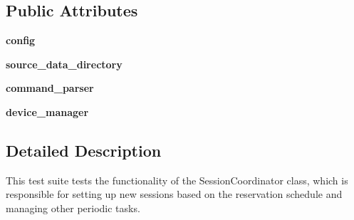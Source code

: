 \subsection*{Public Attributes}
\begin{DoxyCompactItemize}
\item 
\hypertarget{classhwm_1_1sessions_1_1tests_1_1test__coordinator_1_1_test_coordinator_a3f7b40a4155ad7addb3dff58a7bf736a}{{\bfseries config}}\label{classhwm_1_1sessions_1_1tests_1_1test__coordinator_1_1_test_coordinator_a3f7b40a4155ad7addb3dff58a7bf736a}

\item 
\hypertarget{classhwm_1_1sessions_1_1tests_1_1test__coordinator_1_1_test_coordinator_a0967f2e46b04d37f832d79e45121ca29}{{\bfseries source\-\_\-data\-\_\-directory}}\label{classhwm_1_1sessions_1_1tests_1_1test__coordinator_1_1_test_coordinator_a0967f2e46b04d37f832d79e45121ca29}

\item 
\hypertarget{classhwm_1_1sessions_1_1tests_1_1test__coordinator_1_1_test_coordinator_a381dab0b4c5ae898d5c6e901b72707d6}{{\bfseries command\-\_\-parser}}\label{classhwm_1_1sessions_1_1tests_1_1test__coordinator_1_1_test_coordinator_a381dab0b4c5ae898d5c6e901b72707d6}

\item 
\hypertarget{classhwm_1_1sessions_1_1tests_1_1test__coordinator_1_1_test_coordinator_a588c7199169ebb8ee875ae0c3d22325f}{{\bfseries device\-\_\-manager}}\label{classhwm_1_1sessions_1_1tests_1_1test__coordinator_1_1_test_coordinator_a588c7199169ebb8ee875ae0c3d22325f}

\end{DoxyCompactItemize}


\subsection{Detailed Description}
This test suite tests the functionality of the Session\-Coordinator class, which is responsible for setting up new sessions based on the reservation schedule and managing other periodic tasks. 

